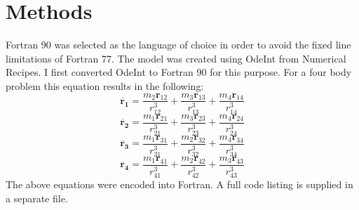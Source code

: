 \documentclass[a4paper,12pt]{article}
\begin{document}
\section{Methods}
Fortran 90 was selected as the language of choice in order to avoid the fixed line limitations of Fortran 77.
The model was created using OdeInt from Numerical Recipes. I first converted OdeInt to Fortran 90 for this purpose.
For a four body problem 
this equation results in the following:
\begin{equation}
\ddot{\mathbf{r_1}}=\frac{m_2\mathbf{r}_{12}}{r^3_{12}}+\frac{m_3\mathbf{r}_{13}}{r^3_{13}}+\frac{m_4\mathbf{r}_{14}}{r^3_{14}}
\end{equation}
\begin{equation}
\ddot{\mathbf{r_2}}=\frac{m_1\mathbf{r}_{21}}{r^3_{21}}+\frac{m_3\mathbf{r}_{23}}{r^3_{23}}+\frac{m_4\mathbf{r}_{24}}{r^3_{24}}
\end{equation}
\begin{equation}
\ddot{\mathbf{r_3}}=\frac{m_1\mathbf{r}_{31}}{r^3_{31}}+\frac{m_2\mathbf{r}_{32}}{r^3_{32}}+\frac{m_4\mathbf{r}_{34}}{r^3_{34}}
\end{equation}
\begin{equation}
\ddot{\mathbf{r_4}}=\frac{m_1\mathbf{r}_{41}}{r^3_{41}}+\frac{m_2\mathbf{r}_{42}}{r^3_{42}}+\frac{m_3\mathbf{r}_{43}}{r^3_{43}}
\end{equation}
The above equations were encoded into Fortran. A full code listing is supplied in a separate file.
\end{document}

